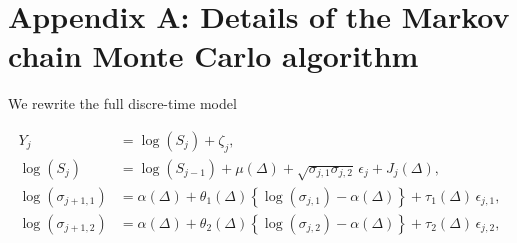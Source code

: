 
\section{Appendix A: Details of the Markov chain Monte Carlo algorithm}\label{ap:mcmc}
We rewrite the full discre-time model

\begin{align}
  Y_j &= \log(S_j) + \zeta_j  ,   \nonumber \\
  \log(S_{j}) &= \log(S_{j-1}) + \mu(\Delta) + \sqrt{\sigma_{j,1}\sigma_{j,2}} \, \epsilon_{j} + J_j(\Delta)   ,  \label{eq:mod2-appendix} \\
  \log(\sigma_{j+1,1}) &= \alpha(\Delta) + \theta_1(\Delta) \left\{ \log(\sigma_{j,1}) - \alpha(\Delta) \right\} + \tau_1(\Delta) \, \epsilon_{j,1}    ,  \nonumber \\
  \log(\sigma_{j+1,2}) &= \alpha(\Delta) + \theta_2(\Delta) \left\{ \log(\sigma_{j,2}) - \alpha(\Delta) \right\} + \tau_2(\Delta) \, \epsilon_{j,2}    , \nonumber
\end{align}

